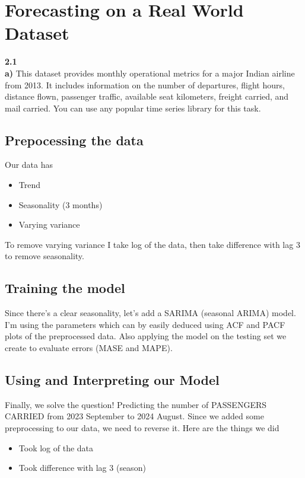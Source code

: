 \section{Forecasting on a Real World Dataset}
\textbf{2.1}\\
\textbf{a)}
This dataset provides monthly operational metrics for a major Indian airline from 2013. It includes information on the number of departures, flight hours, distance flown, passenger traffic, available seat kilometers, freight carried, and mail carried. You can use any popular time series library for this task. 
\subsection{Prepocessing the data}
Our data has
\begin{itemize}
	\item Trend
	\item Seasonality (3 months)
	\item Varying variance
\end{itemize}

To remove varying variance I take log of the data, then take difference with lag 3 to remove seasonality.
\subsection{Training the model}
Since there's a clear seasonality, let's add a SARIMA (seasonal ARIMA) model. I'm using the parameters which can by easily deduced using ACF and PACF plots of the preprocessed data. Also applying the model on the testing set we create to evaluate errors (MASE and MAPE).
\subsection{Using and Interpreting our Model}
Finally, we solve the question! Predicting the number of PASSENGERS CARRIED from 2023 September to 2024 August. Since we added some preprocessing to our data, we need to reverse it. Here are the things we did
\begin{itemize}
	\item Took log of the data
	\item Took difference with lag 3 (season)
\end{itemize}

